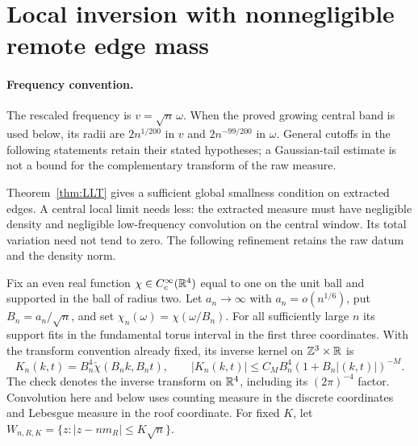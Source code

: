 \section{Local inversion with nonnegligible remote edge mass}

\paragraph{Frequency convention.}
The rescaled frequency is $v=\sqrt n\,\omega$. When the proved growing
central band is used below, its radii are $2n^{1/200}$ in $v$ and
$2n^{-99/200}$ in $\omega$. General cutoffs in the following statements
retain their stated hypotheses; a Gaussian-tail estimate is not a bound
for the complementary transform of the raw measure.

\label{sec:localized-inversion}
Theorem~\ref{thm:LLT} gives a sufficient global smallness condition on
extracted edges. A central local limit needs less: the extracted measure
must have negligible density and negligible low-frequency convolution
on the central window. Its total variation need not tend to zero.
The following refinement retains the raw datum and the density norm.

Fix an even real function $\chi\in C_c^\infty(\mathbb R^4)$ equal to one on
the unit ball and supported in the ball of radius two. Let $a_n\to\infty$
with $a_n=o(n^{1/6})$, put $B_n=a_n/\sqrt n$, and set
$\chi_n(\omega)=\chi(\omega/B_n)$. For all sufficiently large $n$ its
support fits in the fundamental torus interval in the first three
coordinates. With the transform convention already fixed, its inverse
kernel on $\mathbb Z^3\times\mathbb R$ is
\begin{equation}\label{eq:localized-kernel}
 K_n(k,t)=B_n^4\check\chi(B_nk,B_nt),\qquad
 |K_n(k,t)|\le C_M B_n^4(1+B_n|(k,t)|)^{-M}.
\end{equation}
The check denotes the inverse transform on $\mathbb R^4$, including its
$(2\pi)^{-4}$ factor. Convolution here and below uses counting measure
in the discrete coordinates and Lebesgue measure in the roof coordinate.
For fixed $K$, let $W_{n,R,K}=\{z:|z-nm_R|\le K\sqrt n\}$.

